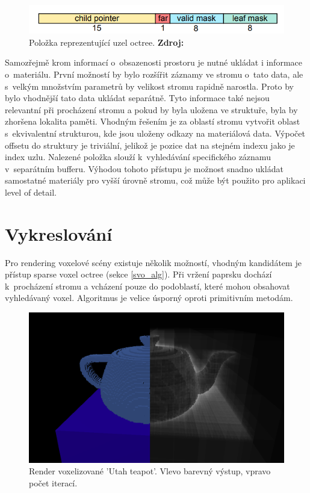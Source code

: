 \begin{figure}[H]
	\centering
	\includegraphics[scale=1.3]{obrazky-figures/octree_child_data.png}
	\caption{Položka reprezentující uzel octree. \textbf{Zdroj: \cite{Laine2011EfficientSV}}}
	\label{fig:octree_child}
\end{figure}

Samozřejmě krom informací o~obsazenosti prostoru je nutné ukládat i informace o~materiálu. První možností by bylo rozšířit záznamy ve stromu o~tato data, ale s~velkým množstvím parametrů by velikost stromu rapidně narostla. Proto by bylo vhodnější tato data ukládat separátně. Tyto informace také nejsou relevantní při procházení stromu a pokud by byla uložena ve struktuře, byla by zhoršena lokalita paměti. Vhodným řešením je za oblastí stromu vytvořit oblast s~ekvivalentní strukturou, kde jsou uloženy odkazy na materiálová data. Výpočet offsetu do struktury je triviální, jelikož je pozice dat na stejném indexu jako je index uzlu. Nalezené položka slouží k~vyhledávání specifického záznamu v~separátním bufferu. Výhodou tohoto přístupu je možnost snadno ukládat samostatné materiály pro vyšší úrovně stromu, což může být použito pro aplikaci level of detail.

\section{Vykreslování}
Pro rendering voxelové scény existuje několik možností, vhodným kandidátem je přístup sparse voxel octree (sekce \ref{svo_alg}). Při vržení paprsku dochází k~procházení stromu a vcházení pouze do podoblastí, které mohou obsahovat vyhledávaný voxel. Algoritmus je velice úsporný oproti primitivním metodám.

\begin{figure}[H]
	\centering
	\includegraphics[scale=1]{obrazky-figures/color_iter_svo.png}
	\caption{Render voxelizované 'Utah teapot'. Vlevo barevný výstup, vpravo počet iterací. }
	\label{fig:octree_child}
\end{figure}


